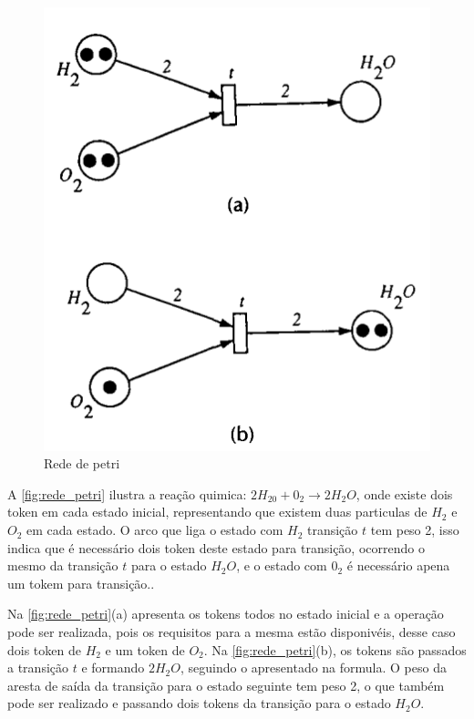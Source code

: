 \begin{figure}[htb]
	\begin{center}
    \caption{\label{fig:rede_petri}Rede de petri}
	\includegraphics[scale=0.60]{Figuras/rede_petri.png}
	\end{center}
\end{figure}

\par
A \autoref{fig:rede_petri} ilustra a reação quimica: $2H_20 + 0_2 \rightarrow 2H_2O$, onde existe dois token em cada estado inicial, representando que existem duas particulas de $H_2$ e $O_2$ em cada estado. O arco que liga o estado com $H_2$  transição $t$ tem peso 2, isso indica que é necessário dois token deste estado para transição, ocorrendo o mesmo da transição $t$ para o estado $H_2O$, e o estado com $0_2$ é necessário apena um tokem para transição.\cite{murata1989petri}.

\par
Na \autoref{fig:rede_petri}(a) apresenta os tokens todos no estado inicial e a operação pode ser realizada, pois os requisitos para a mesma estão disponivéis, desse caso dois token de $H_2$ e um token de $O_2$. Na \autoref{fig:rede_petri}(b), os tokens são passados a transição $t$ e formando $2H_2O$, seguindo o apresentado na formula. O peso da aresta de saída da transição para o estado seguinte tem peso 2, o que também pode ser realizado e passando dois tokens da transição para o estado $H_2O$\cite{murata1989petri}. 


